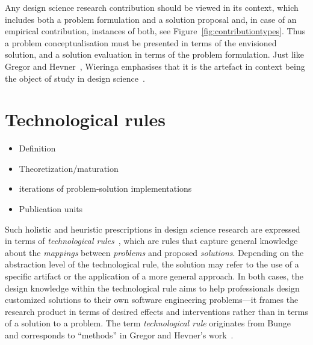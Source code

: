 \documentclass[graybox]{svmult}
\newcommand{\emelie}[1]{\textcolor{red}{{\it [Emelie says: #1]}}}
\newcommand{\emelie}[1]{}
\begin{document}
Any design science research contribution should be viewed in its context, which includes both a problem formulation and a solution proposal and, in case of an empirical contribution, instances of both, see Figure~\ref{fig:contributiontypes}. Thus a problem conceptualisation must be presented in terms of the envisioned solution, and a solution evaluation in terms of the problem formulation. 
Just like Gregor and Hevner~\cite{gregor_positioning_2013}, Wieringa emphasises that it is the artefact in context being the object of study in design science~\cite{wieringa_design_2009}.

\section{Technological rules}
\begin{itemize}
\item Definition
\item Theoretization/maturation
\item iterations of problem-solution implementations
\item Publication units
\end{itemize}

Such holistic and heuristic prescriptions in design science research are expressed in terms of \emph{technological rules}~\cite{aken_management_2004}, which are rules that capture general knowledge about the \emph{mappings} between \emph{problems} and proposed \emph{solutions}. Depending on the abstraction level of the technological rule, the solution may refer to the use of a specific artifact or the application of a more general approach. In both cases, the design knowledge within the technological rule aims to help professionals design customized solutions to their own software engineering problems---it frames the research product in terms of desired effects and interventions rather than in terms of a solution to a problem. The term \emph{technological rule} originates from Bunge~\cite{bunge_philosophy_1998} and corresponds to ``methods'' in Gregor and Hevner's work~\cite{gregor_positioning_2013}.%
\end{document}

